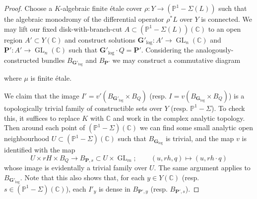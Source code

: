\documentclass[10pt]{article}
\numberwithin{equation}{section}
\theoremstyle{plain}
\theoremstyle{definition}
\theoremstyle{remark}
\newcommand{\GL}{\operatorname{GL}}
\begin{document}

\begin{proof}
Choose a $K$-algebraic finite \'etale cover $\rho : Y \to (\mathbb{P}^1 - \Sigma(L))$ such that the algebraic monodromy of the differential operator $\rho^{*} L$ over $Y$ is connected. We may lift our fixed disk-with-branch-cut $A \subset (\mathbb{P}^1 - \Sigma(L))(\mathbb{C})$ to an open region $A' \subset Y(\mathbb{C})$ and construct solutions $\mathbf{G}'_{\operatorname{log}} : A' \to \GL_{n}(\mathbb{C})$ and $\mathbf{P}' : A' \to \GL_{n}(\mathbb{C})$ such that $\mathbf{G}'_{\operatorname{log}} \cdot Q = \mathbf{P}'$. Considering the analogously-constructed bundles $B_{\mathbf{G}'_{\operatorname{log}}}$ and $B_{\mathbf{P}'}$ we may construct a commutative diagram 
\begin{center}
\label{bunddiag}
\end{center}
where $\mu$ is finite \'etale. 

We claim that the image $I' = v'(B_{\mathbf{G}'_{\operatorname{log}}} \times B_{Q})$ (resp. $I = v(B_{\mathbf{G}_{\operatorname{log}}} \times B_{Q})$) is a topologically trivial family of constructible sets over $Y$ (resp. $\mathbb{P}^1 - \Sigma$). To check this, it suffices to replace $K$ with $\mathbb{C}$ and work in the complex analytic topology. Then around each point of $(\mathbb{P}^1 - \Sigma)(\mathbb{C})$ we can find some small analytic open neighbourhood $U \subset (\mathbb{P}^1 - \Sigma)(\mathbb{C})$ such that $B_{\mathbf{G}_{\operatorname{log}}}$ is trivial, and the map $v$ is identified with the map
\[ U \times r H \times B_{Q} \to B_{\mathbf{P},s} \subset U \times \GL_{m}; \hspace{2em} (u, rh, q) \mapsto (u, rh \cdot q) \]
whose image is evidentally a trivial family over $U$. The same argument applies to $B_{\mathbf{G}'_{\operatorname{log}}}$. Note that this also shows that, for each $y \in Y(\mathbb{C})$ (resp. $s \in (\mathbb{P}^1 - \Sigma)(\mathbb{C})$), each $I'_{y}$ is dense in $B_{\mathbf{P}',y}$ (resp. $B_{\mathbf{P}',s}$).


\end{proof}
\end{document}
